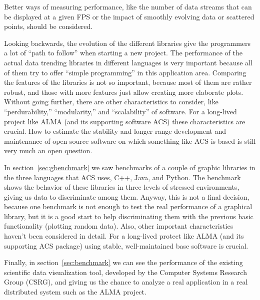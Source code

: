 
Better ways of measuring performance,
like the number of data streams that can be displayed at a given FPS
or the impact of smoothly evolving data or scattered points,
should be considered.

Looking backwards, the evolution of the different libraries give the
programmers a lot of ``path to follow'' when starting a new project. The performance
of the actual data trending libraries in different languages is very important
because all of them try to offer ``simple programming'' in this application area.
Comparing the features of the libraries is not so important, because most of them
are rather robust, and those with more features just allow creating more elaborate plots.
Without going further, there are other characteristics to consider, like
``perdurability,'' ``modularity,'' and ``scalability'' of software.
For a long-lived project like ALMA
(and its supporting software ACS)
these characteristics are crucial.
How to estimate the stability and longer range development and maintenance
of open source software on which something like ACS is based
is still very much an open question.

In section~\ref{sec:gbenchmark} we saw benchmarks of a couple of graphic libraries
in the three languages that ACS uses, C++, Java, and Python.
The benchmark shows the behavior of these libraries in three levels
of stressed environments, giving us data to discriminate among them.
Anyway, this is not a final decision, because one benchmark is not enough to test the real
performance of a graphical library, but it is a good start to help discriminating them with the previous
basic functionality (plotting random data).
Also,
other important characteristics haven't been considered in detail.
For a long-lived protect like ALMA
(and its supporting ACS package)
using stable, well-maintained base software is crucial.

Finally, in section~\ref{sec:benchmark} we can see the performance of
the existing scientific data visualization tool, developed by the Computer Systems Research Group (CSRG),
and giving us the chance to analyze a real application in a real distributed system such as the
ALMA project.

